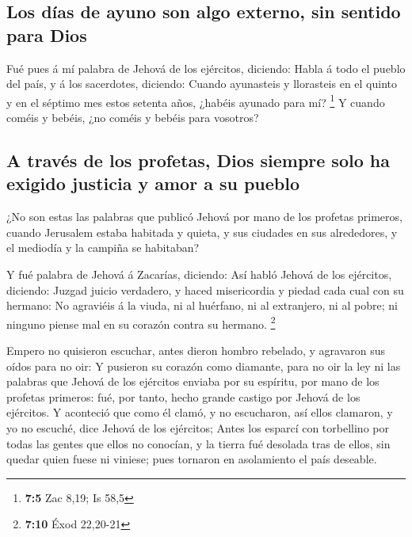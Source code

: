 \hypertarget{los-duxedas-de-ayuno-son-algo-externo-sin-sentido-para-dios}{%
\subsection{Los días de ayuno son algo externo, sin sentido para
Dios}\label{los-duxedas-de-ayuno-son-algo-externo-sin-sentido-para-dios}}

 Fué pues á mí palabra de Jehová de los ejércitos, diciendo:
 Habla á todo el pueblo del país, y á los sacerdotes,
diciendo: Cuando ayunasteis y llorasteis en el quinto y en el séptimo
mes estos setenta años, ¿habéis ayunado para mí? \footnote{\textbf{7:5}
  Zac 8,19; Is 58,5}  Y cuando coméis y bebéis, ¿no coméis y
bebéis para vosotros?

\hypertarget{a-travuxe9s-de-los-profetas-dios-siempre-solo-ha-exigido-justicia-y-amor-a-su-pueblo}{%
\subsection{A través de los profetas, Dios siempre solo ha exigido
justicia y amor a su
pueblo}\label{a-travuxe9s-de-los-profetas-dios-siempre-solo-ha-exigido-justicia-y-amor-a-su-pueblo}}

 ¿No son estas las palabras que publicó Jehová por mano de
los profetas primeros, cuando Jerusalem estaba habitada y quieta, y sus
ciudades en sus alrededores, y el mediodía y la campiña se habitaban?

 Y fué palabra de Jehová á Zacarías, diciendo: 
Así habló Jehová de los ejércitos, diciendo: Juzgad juicio verdadero, y
haced misericordia y piedad cada cual con su hermano:  No
agraviéis á la viuda, ni al huérfano, ni al extranjero, ni al pobre; ni
ninguno piense mal en su corazón contra su hermano. \footnote{\textbf{7:10}
  Éxod 22,20-21}

 Empero no quisieron escuchar, antes dieron hombro
rebelado, y agravaron sus oídos para no oir:  Y pusieron su
corazón como diamante, para no oir la ley ni las palabras que Jehová de
los ejércitos enviaba por su espíritu, por mano de los profetas
primeros: fué, por tanto, hecho grande castigo por Jehová de los
ejércitos.  Y aconteció que como él clamó, y no escucharon,
así ellos clamaron, y yo no escuché, dice Jehová de los ejércitos;
 Antes los esparcí con torbellino por todas las gentes que
ellos no conocían, y la tierra fué desolada tras de ellos, sin quedar
quien fuese ni viniese; pues tornaron en asolamiento el país deseable.

